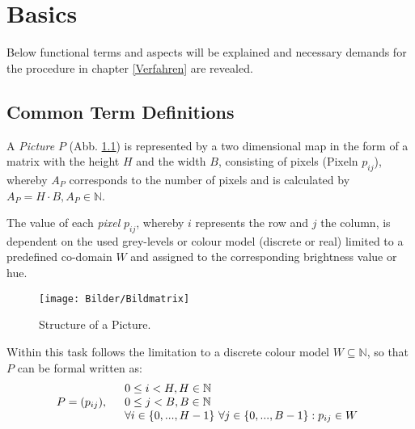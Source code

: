 \chapter{Basics}
  Below functional terms and aspects will be explained and necessary\linebreak 
  demands for the procedure in chapter \ref{Verfahren} are revealed.

\section{Common Term Definitions}
  A \textit{Picture} $P$ (Abb. \ref{Bildmatrix}) is represented by a two dimensional map in the form of a matrix with the height $H$ and the width $B$, consisting of pixels (Pixeln $p_{ij}$)\linebreak, whereby $A_P$ corresponds to the number of pixels and is calculated by $A_P = H\cdot B, A_P\in\mathbb{N}$.  

  The value of each \textit{pixel} $p_{ij}$, whereby $i$ represents the row and $j$ the column, is dependent on the used grey-levels or colour model (discrete or real) limited to a predefined co-domain $W$ and assigned to the corresponding brightness value or hue. \cite{Ste02}
   \cite{Ste02}
  \begin{figure}[!b]
    \centering
    \texttt{[image: Bilder/Bildmatrix]}
    \caption{Structure of a Picture. \cite{Wilhelm2005}}
    \label{Bildmatrix}
  \end{figure}
  
  \noindent Within this task follows the limitation to a discrete colour model $W\subseteq\mathbb{N}$, so that $P$ can be formal written as:
  \begin{equation}\label{DefBild}
    P = (p_{ij}), 
    \quad\begin{array}{l}
      0\leq i < H, H\in\mathbb{N}\\
      0\leq j < B, B\in\mathbb{N}\\
      \forall i\in\{0, ..., H-1\}\textrm{\space} \forall j\in\{0, ..., B-1\}:p_{ij}\in W
    \end{array}
  \end{equation}

